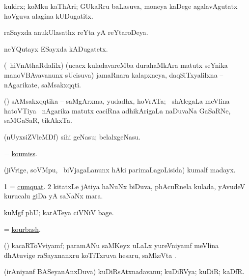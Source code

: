 \bentry
{}
\gl{\nA}
\bmng
kukirx; koMku kaThAri; GUkaRru baLasuva, moneya kaDege agalavAgutatx hoVguva alagina kUDugatitx.   
\emng
\eentry

\bentry
{}
\gl{\nA}
\bmng
raSayxda anukUlasathx reYta yA reYtaroDeya. 
\emng
\eentry

\bentry
{}
\gl{\nA}
\bmng
neYQutayx ESayxda kADugatetx. 
\emng
\eentry

\bentry
{}
\gl{\nA}
\expl{\G}
\bmng
(\kanmu\ hiVnAthaRdalilx) (ucacx kuladavareMba durahaMkAra matutx seYnika manoVBAvavanunx sUcisuva) jamaRnara kalapxneya, daqSiTxyalilxna -- nAgarikate, saMsakxqqti. 
\emng
\eentry

\bentry
{}
\gl{\nA}
\expl{\G}
\bmng
(\ca) sAMsakxqqtika -- saMgArxma, yudadhx, hoVrATa; \kanmu\ shAlegaLa meVlina hatoVTiya \vi\ nAgarika matutx caciRna adhikArigaLa naDuvaNa GaSaRNe, saMGaSaR, tikAkxTa. 
\emng
\eentry

\bentry
{}
\gl{\nA}
\bmng
(nUyxsiZVleMDf) sihi geNasu; belalxgeNasu. 
\emng
\eentry

\bentry
{}
\gl{\nA}
\bmng
 = \hyperlink{koumiss}{koumiss}. 
\emng
\eentry

\bentry
{}
\gl{\nA}
\bmng
(jiVrige, soVMpu, \mo\ biVjagaLanunx hAki parimaLagoLisida) kumalf madayx. 
\emng
\eentry

\bentry
{}
\gl{\nA}
\bmng
\bnum
\num{1} = \hyperref{kandict_c.pdf}{C}{cumquat}{cumquat}. 
\num{2} kitatxLe jAtiya haNuNx biDuva, phAcuRnela kulada, yAvudeV kurucalu giDa yA saNaNx mara. 
\enum
\emng
\eentry

\bentry
{}
\gl{\nA}
\bmng
kuMgf phU; karATeya ciVNiV bage. 
\emng
\eentry

\bentry
{}
\gl{\nA}
\bmng
 = \hyperlink{kourbash}{kourbash}. 
\emng
\eentry

\bentry
{}
\gl{\nA}
\bmng
(\ravi) kacaRToVviyamf; paramANu saMKeyx  uLaLx yureVniyamf meVlina dhAtuvige raSayxnanxru koTiTxruva hesaru, saMkeVta . 
\emng
\eentry

\bentry
{}
\gl{\nA}
\bmng
(irAniyanf BASeyanAnxDuva) kuDiRsAtxnadavanu; kuDiRVya; kuDiR; kaDfR. 
\emng
\eentry

